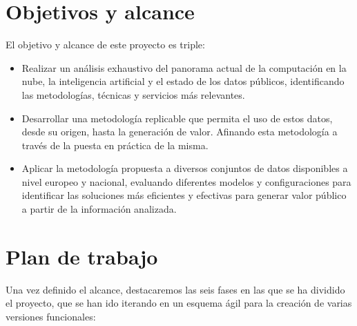 \section{Objetivos y alcance}

El objetivo y alcance de este proyecto es triple:
\begin{itemize}
	\item Realizar un análisis exhaustivo del panorama actual de la computación en la nube, la inteligencia artificial y el estado de los datos públicos, identificando las metodologías, técnicas y servicios más relevantes.
	
	\item Desarrollar una metodología replicable que permita el uso de estos datos, desde su origen, hasta la generación de valor. Afinando esta metodología a través de la puesta en práctica de la misma.
	
	\item Aplicar la metodología propuesta a diversos conjuntos de datos disponibles a nivel europeo y nacional, evaluando diferentes modelos y configuraciones para identificar las soluciones más eficientes y efectivas para generar valor público a partir de la información analizada.
	
\end{itemize}


\section{Plan de trabajo}

Una vez definido el alcance, destacaremos las seis fases en las que se ha dividido el proyecto, que se han ido iterando en un esquema ágil para la creación de varias versiones funcionales:


